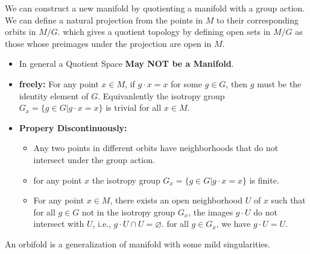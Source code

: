 We can construct a new manifold by quotienting a manifold with a group action.
We can define a natural projection from the points in \( M \) to
their corresponding orbits in \( M/G \). which gives a quotient
topology by defining open sets in \( M/G \) as those whose preimages
under the projection are open in \( M \).
\begin{itemize}
  \item In general a Quotient Space \textbf{May NOT be a Manifold}.
\end{itemize}
\begin{itemize}
  \item \textbf{freely:} For any point \( x \in M \), if \( g \cdot x
    = x \) for some \( g \in G \), then \( g \) must be the identity
    element of \( G \). Equivanlently the isotropy group \( G_x = \{g
    \in G | g \cdot x = x\} \) is trivial for all \( x \in M \).
  \item \textbf{Propery Discontinuously:}
    \begin{itemize}
      \item Any two points in different orbits have neighborhoods
        that do not intersect under the group action.
      \item for any point $ x $ the isotropy group $ G_x=\{g\in
        G|g\cdot x=x\} $ is finite.
      \item For any point $ x\in M $, there exists an open
        neighborhood $ U $ of $ x $ such that for all $ g\in G $ not
        in the isotropy group $ G_x $, the images $ g\cdot U $ do not
        intersect with $ U $, i.e., $ g\cdot U\cap U=\varnothing $.
        for all $ g \in G_x $, we have $ g\cdot U=U $.
    \end{itemize}
\end{itemize}
An orbifold is a generalization of manifold with some mild singularities.

